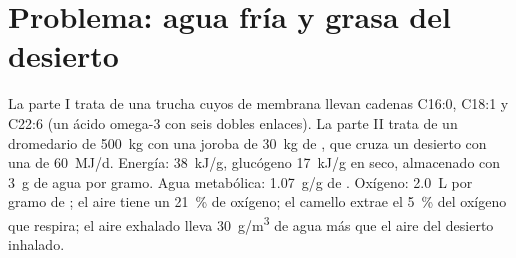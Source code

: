 \section{Problema: agua fría y grasa del desierto}

\begin{problem}
\label{pb:b1:lipids:1}
La parte I trata de una trucha cuyos  de membrana llevan cadenas
C16:0, C18:1 y C22:6 (un ácido omega-3 con seis dobles enlaces). La parte II
trata de un dromedario de \qty{500}{kg} con una joroba de \qty{30}{kg} de
, que cruza un desierto con una  de
\qty{60}{MJ/d}. Energía:  \qty{38}{kJ/g}, glucógeno \qty{17}{kJ/g} en
seco, almacenado con \qty{3}{g} de agua por gramo. Agua metabólica:
\qty{1.07}{g/g} de . Oxígeno: \qty{2.0}{L} por gramo de ; el aire
tiene un \qty{21}{\%} de oxígeno; el camello extrae el \qty{5}{\%} del
oxígeno que respira; el aire exhalado lleva \qty{30}{g/m^3} de agua más que
el aire del desierto inhalado.


\end{problem}
